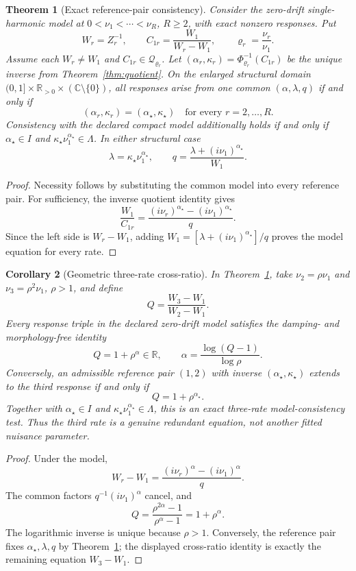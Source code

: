 \documentclass[11pt]{article}
\newtheorem{theorem}{Theorem}
\newtheorem{corollary}[theorem]{Corollary}
\theoremstyle{definition}
\theoremstyle{remark}
\newcommand{\C}{\mathbb C}
\newcommand{\R}{\mathbb R}
\begin{document}
\begin{theorem}[Exact reference-pair consistency]
\label{thm:reference-pair-consistency}
Consider the zero-drift single-harmonic model at
\(0<\nu_1<\cdots<\nu_R\), \(R\ge2\), with exact nonzero responses.  Put
\[
 W_r=Z_r^{-1},\qquad
 C_{1r}=\frac{W_1}{W_r-W_1},\qquad
 \varrho_r=\frac{\nu_r}{\nu_1}.
\]
Assume each \(W_r\ne W_1\) and
\(C_{1r}\in\mathcal Q_{\varrho_r}\).  Let
\((\alpha_r,\kappa_r)=\Phi_{\varrho_r}^{-1}(C_{1r})\) be the unique inverse
from Theorem~\ref{thm:quotient}.  On the enlarged structural domain
\((0,1]\times\R_{>0}\times(\C\setminus\{0\})\), all responses arise from one
common \((\alpha,\lambda,q)\) if and only if
\[
 (\alpha_r,\kappa_r)=(\alpha_\star,\kappa_\star)
 \quad\text{for every }r=2,\ldots,R.
\]
Consistency with the declared compact model additionally holds if and only if
\(\alpha_\star\in I\) and
\(\kappa_\star\nu_1^{\alpha_\star}\in\Lambda\).  In either structural case
\[
 \lambda=\kappa_\star\nu_1^{\alpha_\star},\qquad
 q=\frac{\lambda+(i\nu_1)^{\alpha_\star}}{W_1}.
\]
\end{theorem}
\begin{proof}
Necessity follows by substituting the common model into every reference pair.
For sufficiency, the inverse quotient identity gives
\[
 \frac{W_1}{C_{1r}}
 =\frac{(i\nu_r)^{\alpha_\star}-(i\nu_1)^{\alpha_\star}}q.
\]
Since the left side is \(W_r-W_1\), adding
\(W_1=[\lambda+(i\nu_1)^{\alpha_\star}]/q\) proves the model equation for
every rate.
\end{proof}

\begin{corollary}[Geometric three-rate cross-ratio]
\label{cor:geometric-three-rate}
In Theorem~\ref{thm:reference-pair-consistency}, take
\(\nu_2=\rho\nu_1\) and \(\nu_3=\rho^2\nu_1\), \(\rho>1\), and define
\[
 Q=\frac{W_3-W_1}{W_2-W_1}.
\]
Every response triple in the declared zero-drift model satisfies the
damping- and morphology-free identity
\[
 Q=1+\rho^\alpha\in\R,\qquad
 \alpha=\frac{\log(Q-1)}{\log\rho}.
\]
Conversely, an admissible reference pair \((1,2)\) with inverse
\((\alpha_\star,\kappa_\star)\) extends to the third response if and only if
\[
 Q=1+\rho^{\alpha_\star}.
\]
Together with
\(\alpha_\star\in I\) and
\(\kappa_\star\nu_1^{\alpha_\star}\in\Lambda\), this is an exact
three-rate model-consistency test.  Thus the third rate is a genuine redundant
equation, not another fitted nuisance parameter.
\end{corollary}
\begin{proof}
Under the model,
\[
 W_r-W_1=\frac{(i\nu_r)^\alpha-(i\nu_1)^\alpha}{q}.
\]
The common factors \(q^{-1}(i\nu_1)^\alpha\) cancel, and
\[
 Q=\frac{\rho^{2\alpha}-1}{\rho^\alpha-1}=1+\rho^\alpha.
\]
The logarithmic inverse is unique because \(\rho>1\).  Conversely, the
reference pair fixes \(\alpha_\star,\lambda,q\) by
Theorem~\ref{thm:reference-pair-consistency}; the displayed cross-ratio
identity is exactly the remaining equation \(W_3-W_1\).
\end{proof}
\end{document}
